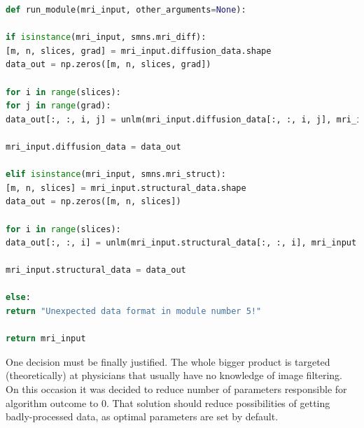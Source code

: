 \begin{lstlisting}[language=Python, caption = run\_module function.]
def run_module(mri_input, other_arguments=None):

if isinstance(mri_input, smns.mri_diff):
[m, n, slices, grad] = mri_input.diffusion_data.shape
data_out = np.zeros([m, n, slices, grad])

for i in range(slices):
for j in range(grad):
data_out[:, :, i, j] = unlm(mri_input.diffusion_data[:, :, i, j], mri_input.noise_map[:, :, i, j])

mri_input.diffusion_data = data_out

elif isinstance(mri_input, smns.mri_struct):
[m, n, slices] = mri_input.structural_data.shape
data_out = np.zeros([m, n, slices])

for i in range(slices):
data_out[:, :, i] = unlm(mri_input.structural_data[:, :, i], mri_input.noise_map[:, :, i])

mri_input.structural_data = data_out

else:
return "Unexpected data format in module number 5!"

return mri_input
\end{lstlisting}

One decision must be finally justified. The whole bigger product is targeted (theoretically) at physicians that usually have no knowledge of image filtering. On this occasion it was decided to reduce number of parameters responsible for algorithm outcome to 0. That solution should reduce possibilities of getting badly-processed data, as optimal parameters are set by default.
